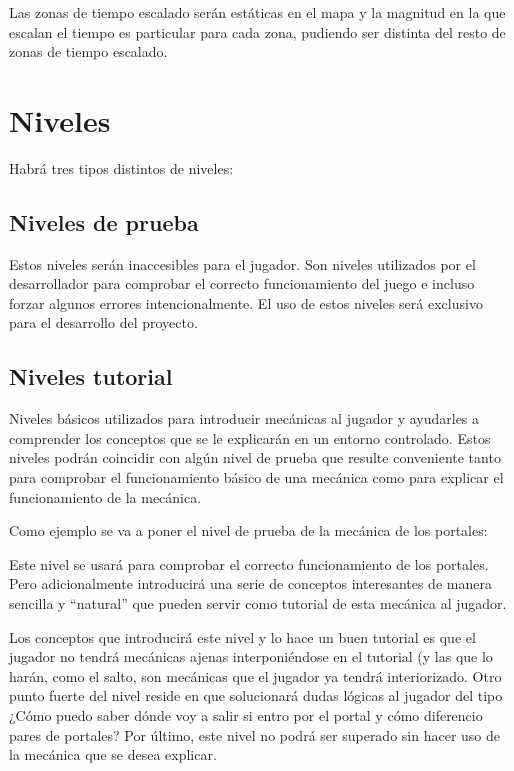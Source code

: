 Las zonas de tiempo escalado serán estáticas en el mapa y la magnitud en la que escalan el tiempo es particular para cada zona, pudiendo ser distinta del resto de zonas de tiempo escalado.


\section{Niveles}
Habrá tres tipos distintos de niveles:

\subsection{Niveles de prueba}
Estos niveles serán inaccesibles para el jugador. Son niveles utilizados por el desarrollador para comprobar el correcto funcionamiento del juego e incluso forzar algunos errores intencionalmente. El uso de estos niveles será exclusivo para el desarrollo del proyecto.

\subsection{Niveles tutorial}
Niveles básicos utilizados para introducir mecánicas al jugador y ayudarles a comprender los conceptos que se le explicarán en un entorno controlado. Estos niveles podrán coincidir con algún nivel de prueba que resulte conveniente tanto para comprobar el funcionamiento básico de una mecánica como para explicar el funcionamiento de la mecánica.

Como ejemplo se va a poner el nivel de prueba de la mecánica de los portales:


Este nivel se usará para comprobar el correcto funcionamiento de los portales. Pero adicionalmente introducirá una serie de conceptos interesantes de manera sencilla y “natural” que pueden servir como tutorial de esta mecánica al jugador. 

Los conceptos que introducirá este nivel y lo hace un buen tutorial es que el jugador no tendrá mecánicas ajenas interponiéndose en el tutorial (y las que lo harán, como el salto, son mecánicas que el jugador ya tendrá interiorizado. Otro punto fuerte del nivel reside en que solucionará dudas lógicas al jugador del tipo ¿Cómo puedo saber dónde voy a salir si entro por el portal y cómo diferencio pares de portales? Por último, este nivel no podrá ser superado sin hacer uso de la mecánica que se desea explicar.

